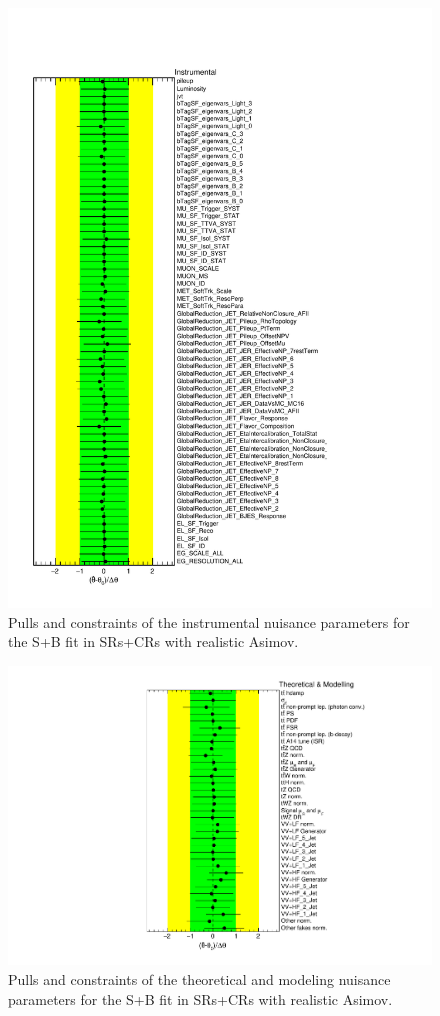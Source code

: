 \begin{figure}[htbp]
	\centering
	\includegraphics[width=.8\textwidth]{Appendices/AP9/figures/SPLUSB_CRSR_UsingBaseFullSys/NuisPar_Instrumental}
	\caption{Pulls and constraints of the instrumental nuisance parameters for the S+B \tZc fit in SRs+CRs with realistic Asimov.}%
	\label{fig:stat:tzc:splusb:crsr:np:instr_base}
\end{figure}

\begin{figure}[htbp]
	\centering
	\includegraphics[width=.85\textwidth]{Appendices/AP9/figures/SPLUSB_CRSR_UsingBaseFullSys/NuisPar_Theoretical_&_Modelling}
	\caption{Pulls and constraints of the theoretical and modeling nuisance parameters for the S+B \tZc fit in SRs+CRs with realistic Asimov.}%
	\label{fig:stat:tzc:splusb:crsr:np:model_base}
\end{figure}

